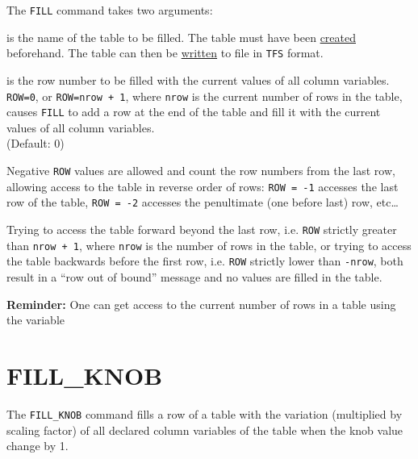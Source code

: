 The \texttt{FILL} command takes two arguments:
\begin{madlist}
   is the name of the table to be filled. The table must
  have been \hyperref[sec:create]{created} beforehand. 
  The table can then be \hyperref[sec:write]{written} to file in
  \texttt{TFS} format. 

   is the row number to be filled with the current values of 
  all column variables. \\ 
  \texttt{ROW=0}, or \texttt{ROW=nrow + 1}, where \texttt{nrow} is the
  current number of rows in the table, causes \texttt{FILL} to add a row at
  the end of the table and fill it with the current values of all
  column variables. \\ (Default: 0) 
\end{madlist}

Negative \texttt{ROW} values are allowed and count the row numbers from
the last row, allowing access to the table in reverse order of rows:
\texttt{ROW = -1} accesses the last row of the table,
\texttt{ROW = -2} accesses the penultimate (one before last) row,
etc\ldots  

Trying to access the table forward beyond the last row, i.e. \texttt{ROW}
strictly greater than \texttt{nrow + 1}, where \texttt{nrow} is the number of
rows in the table, or trying to access the table backwards before the
first row, i.e. \texttt{ROW} strictly lower than \texttt{-nrow}, both
result in a ``row out of bound'' message and no values are filled in the
table. 


\textbf{Reminder:} One can get access to the current number of rows in a
table using the variable 

\section{FILL\_KNOB} 
\label{sec:fill-knob}
The \texttt{FILL\_KNOB} command fills a row of a table with the variation (multiplied by scaling factor) of all declared column variables of the table when the knob value change by 1.

